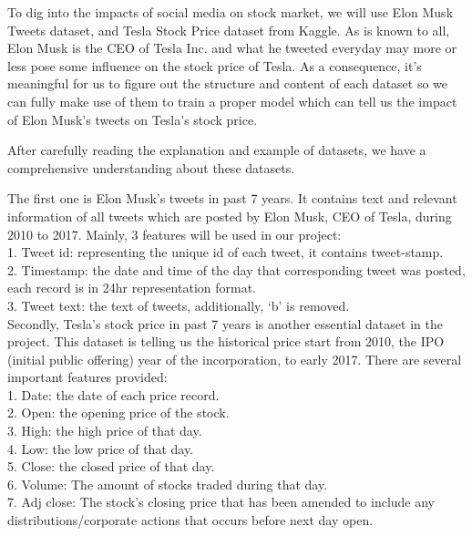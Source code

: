 \documentclass[10pt,twocolumn,letterpaper]{article}
\begin{document}
To dig into the impacts of social media on stock market, we will use Elon Musk Tweets dataset, and Tesla Stock Price dataset from Kaggle. As is known to all, Elon Musk is the CEO of Tesla Inc. and what he tweeted everyday may more or less pose some influence on the stock price of Tesla. As a consequence, it's meaningful for us to figure out the structure and content of each dataset so we can fully make use of them to train a proper model which can tell us the impact of Elon Musk's tweets on Tesla's stock price.

After carefully reading the explanation and example of datasets, we have a comprehensive understanding about these datasets.

The first one is Elon Musk's tweets in past 7 years. It contains text and relevant information of all tweets which are posted by Elon Musk, CEO of Tesla, during 2010 to 2017. Mainly, 3 features will be used in our project:\\
1. Tweet id: representing the unique id of each tweet, it contains tweet-stamp.\\
2. Timestamp: the date and time of the day that corresponding tweet was posted, each record is in 24hr representation format.\\
3. Tweet text: the text of tweets, additionally, ‘b’ is removed.\\

Secondly, Tesla’s stock price in past 7 years is another essential dataset in the project. This dataset is telling us the historical price start from 2010, the IPO (initial public offering) year of the incorporation, to early 2017. There are several important features provided:\\
1. Date: the date of each price record.\\
2. Open:  the opening price of the stock.\\
3. High: the high price of that day.\\
4. Low: the low price of that day.\\
5. Close: the closed price of that day.\\
6. Volume: The amount of stocks traded during that day.\\
7. Adj close: The stock’s closing price that has been amended to include any distributions/corporate actions that occurs before next day open.

\end{document}
